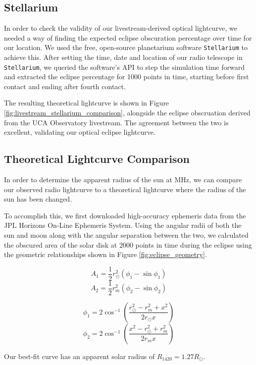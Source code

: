 \subsection{\label{sec:stellarium}Stellarium}

In order to check the validity of our livestream-derived optical lightcurve, we needed a way of finding the expected eclipse obscuration percentage over time for our location.
We used the free, open-source planetarium software \texttt{Stellarium} to achieve this.
After setting the time, date and location of our radio telescope in \texttt{Stellarium}, we queried the software's API to step the simulation time forward and extracted the eclipse percentage for 1000 points in time, starting before first contact and ending after fourth contact.

The resulting theoretical lightcurve is shown in Figure \ref{fig:livestream_stellarium_comparison}, alongside the eclipse obscruation derived from the UCA Observatory livestream.
The agreement between the two is excellent, validating our optical eclipse lightcurve.


\subsection{\label{sec:theoreticalLightcurves}Theoretical Lightcurve Comparison}

In order to determine the apparent radius of the sun at \unit[1420]{MHz}, we can compare our observed radio lightcurve to a theoretical lightcurve where the radius of the sun has been changed.

To accomplish this, we first downloaded high-accuracy ephemeris data from the JPL Horizons On-Line Ephemeris System. Using the angular radii of both the sun and moon along with the angular separation between the two, we calculated the obscured area of the solar disk at 2000 points in time during the eclipse using the geometric relationships shown in Figure \ref{fig:eclipse_geometry}.

\begin{equation}
  A_1 = \frac{1}{2}r_{\odot}^2\left(\phi_1 - \sin\phi_1\right)
\end{equation}
\begin{equation}
  A_2 = \frac{1}{2}r_{m}^2\left(\phi_2 - \sin\phi_2\right)
\end{equation}

\begin{equation}
  \phi_1 = 2\cos^{-1}\left(\frac{r_{\odot}^2 - r_{m}^2+x^2}{2r_{\odot}x}\right)
\end{equation}
\begin{equation}
  \phi_2 = 2\cos^{-1}\left(\frac{x^2 - r_{\odot}^2 + r_{m}^2}{2r_{m}x}\right)
\end{equation}

Our best-fit curve has an apparent solar radius of $R_{\mathrm{1420}} = 1.27 R_{\odot}$.
